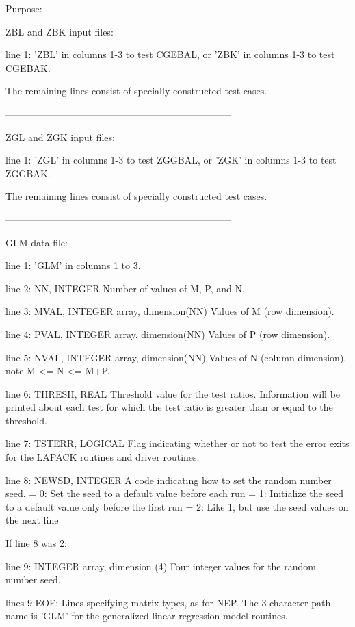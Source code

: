 \begin{DoxyParagraph}{Purpose\+: }
\begin{DoxyVerb}
 ZBL and ZBK input files:

 line 1:  'ZBL' in columns 1-3 to test CGEBAL, or 'ZBK' in
          columns 1-3 to test CGEBAK.

 The remaining lines consist of specially constructed test cases.

-----------------------------------------------------------------------

 ZGL and ZGK input files:

 line 1:  'ZGL' in columns 1-3 to test ZGGBAL, or 'ZGK' in
          columns 1-3 to test ZGGBAK.

 The remaining lines consist of specially constructed test cases.

-----------------------------------------------------------------------

 GLM data file:

 line 1:  'GLM' in columns 1 to 3.

 line 2:  NN, INTEGER
          Number of values of M, P, and N.

 line 3:  MVAL, INTEGER array, dimension(NN)
          Values of M (row dimension).

 line 4:  PVAL, INTEGER array, dimension(NN)
          Values of P (row dimension).

 line 5:  NVAL, INTEGER array, dimension(NN)
          Values of N (column dimension), note M <= N <= M+P.

 line 6:  THRESH, REAL
          Threshold value for the test ratios.  Information will be
          printed about each test for which the test ratio is greater
          than or equal to the threshold.

 line 7:  TSTERR, LOGICAL
          Flag indicating whether or not to test the error exits for
          the LAPACK routines and driver routines.

 line 8:  NEWSD, INTEGER
          A code indicating how to set the random number seed.
          = 0:  Set the seed to a default value before each run
          = 1:  Initialize the seed to a default value only before the
                first run
          = 2:  Like 1, but use the seed values on the next line

 If line 8 was 2:

 line 9:  INTEGER array, dimension (4)
          Four integer values for the random number seed.

 lines 9-EOF:  Lines specifying matrix types, as for NEP.
          The 3-character path name is 'GLM' for the generalized
          linear regression model routines.


\end{DoxyVerb}
\end{DoxyParagraph}
